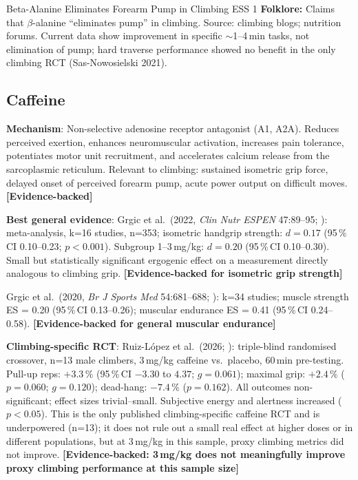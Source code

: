 \begin{folklorebox}{Beta-Alanine Eliminates Forearm Pump in Climbing \cdot \folkloreverified \cdot ESS 1}
\textbf{Folklore:} Claims that $\beta$-alanine ``eliminates pump'' in climbing. Source: climbing blogs; nutrition forums. Current data show improvement in specific $\sim$1--4\,min tasks, not elimination of pump; hard traverse performance showed no benefit in the only climbing RCT (Sas-Nowosielski 2021).
\end{folklorebox}

\subsection{Caffeine}
\label{subsec:caffeine}

\textbf{Mechanism}: Non-selective adenosine receptor antagonist (A1, A2A). Reduces perceived exertion, enhances neuromuscular activation, increases pain tolerance, potentiates motor unit recruitment, and accelerates calcium release from the sarcoplasmic reticulum. Relevant to climbing: sustained isometric grip force, delayed onset of perceived forearm pump, acute power output on difficult moves. \textbf{[Evidence-backed]}

\textbf{Best general evidence}: Grgic et al.\ (2022, \textit{Clin Nutr ESPEN} 47:89--95; \cite{Grg22}): meta-analysis, k=16 studies, n=353; isometric handgrip strength: $d{=}0.17$ (95\,\%\,CI 0.10--0.23; $p{<}0.001$). Subgroup 1--3\,mg/kg: $d{=}0.20$ (95\,\%\,CI 0.10--0.30). Small but statistically significant ergogenic effect on a measurement directly analogous to climbing grip. \textbf{[Evidence-backed for isometric grip strength]}

Grgic et al.\ (2020, \textit{Br J Sports Med} 54:681--688; \cite{WTNZ18}): k=34 studies; muscle strength ES = 0.20 (95\,\%\,CI 0.13--0.26); muscular endurance ES = 0.41 (95\,\%\,CI 0.24--0.58). \textbf{[Evidence-backed for general muscular endurance]}

\textbf{Climbing-specific RCT}: Ruiz-L\'opez et al.\ (2026; \cite{RLMAMR+26}): triple-blind randomised crossover, n=13 male climbers, 3\,mg/kg caffeine vs.\ placebo, 60\,min pre-testing. Pull-up reps: $+3.3\,\%$ (95\,\%\,CI $-3.30$ to $4.37$; $g{=}0.061$); maximal grip: $+2.4\,\%$ ($p{=}0.060$; $g{=}0.120$); dead-hang: $-7.4\,\%$ ($p{=}0.162$). All outcomes non-significant; effect sizes trivial--small. Subjective energy and alertness increased ($p{<}0.05$). This is the only published climbing-specific caffeine RCT and is underpowered (n=13); it does not rule out a small real effect at higher doses or in different populations, but at 3\,mg/kg in this sample, proxy climbing metrics did not improve. \textbf{[Evidence-backed: 3\,mg/kg does not meaningfully improve proxy climbing performance at this sample size]}


